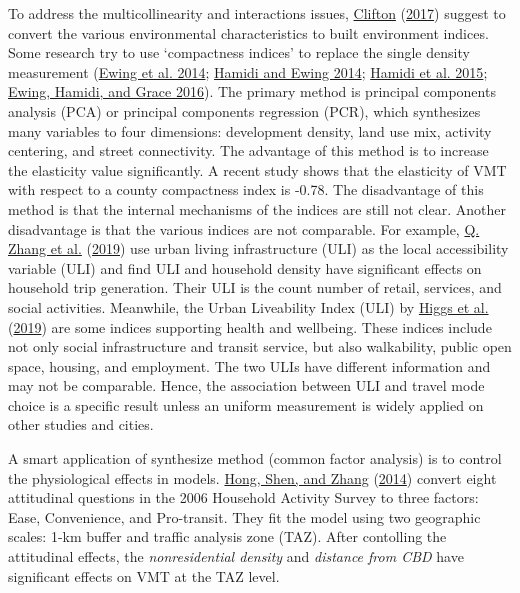 \documentclass[
  11pt,
  openany]{memoir}
\begin{document}
To address the multicollinearity and interactions issues, \protect\hyperlink{ref-cliftonGettingHereThere2017}{Clifton} (\protect\hyperlink{ref-cliftonGettingHereThere2017}{2017}) suggest to convert the various environmental characteristics to built environment indices. Some research try to use `compactness indices' to replace the single density measurement (\protect\hyperlink{ref-ewingRelationshipUrbanSprawl2014}{Ewing et al. 2014}; \protect\hyperlink{ref-hamidiLongitudinalStudyChanges2014}{Hamidi and Ewing 2014}; \protect\hyperlink{ref-hamidiMeasuringSprawlIts2015}{Hamidi et al. 2015}; \protect\hyperlink{ref-ewingUrbanSprawlRisk2016}{Ewing, Hamidi, and Grace 2016}). The primary method is principal components analysis (PCA) or principal components regression (PCR), which synthesizes many variables to four dimensions: development density, land use mix, activity centering, and street connectivity. The advantage of this method is to increase the elasticity value significantly. A recent study shows that the elasticity of VMT with respect to a county compactness index is -0.78. The disadvantage of this method is that the internal mechanisms of the indices are still not clear. Another disadvantage is that the various indices are not comparable. For example, \protect\hyperlink{ref-zhangHouseholdTripGeneration2019}{Q. Zhang et al.} (\protect\hyperlink{ref-zhangHouseholdTripGeneration2019}{2019}) use urban living infrastructure (ULI) as the local accessibility variable (ULI) and find ULI and household density have significant effects on household trip generation. Their ULI is the count number of retail, services, and social activities. Meanwhile, the Urban Liveability Index (ULI) by \protect\hyperlink{ref-higgsUrbanLiveabilityIndex2019}{Higgs et al.} (\protect\hyperlink{ref-higgsUrbanLiveabilityIndex2019}{2019}) are some indices supporting health and wellbeing. These indices include not only social infrastructure and transit service, but also walkability, public open space, housing, and employment. The two ULIs have different information and may not be comparable. Hence, the association between ULI and travel mode choice is a specific result unless an uniform measurement is widely applied on other studies and cities.

A smart application of synthesize method (common factor analysis) is to control the physiological effects in models. \protect\hyperlink{ref-hongHowBuiltenvironmentFactors2014}{Hong, Shen, and Zhang} (\protect\hyperlink{ref-hongHowBuiltenvironmentFactors2014}{2014}) convert eight attitudinal questions in the 2006 Household Activity Survey to three factors: Ease, Convenience, and Pro-transit. They fit the model using two geographic scales: 1-km buffer and traffic analysis zone (TAZ). After contolling the attitudinal effects, the \emph{nonresidential density} and \emph{distance from CBD} have significant effects on VMT at the TAZ level.
\end{document}
